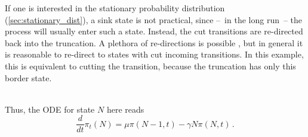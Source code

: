 \begin{example}
If one is interested in the stationary probability distribution (\autoref{sec:stationary_dist}), a sink state is not practical, since --~in the long run~-- the process will usually enter such a state.
Instead, the cut transitions are re-directed back into the truncation.
A plethora of re-directions is possible \parencite{gupta2017finite,kuntz2021stationary,spieler2014numerical}, but in general it is reasonable to re-direct to states with cut incoming transitions.
In this example, this is equivalent to cutting the transition, because the truncation has only this border state.
\vspace{2em}\\
\vspace{2em}\\
Thus, the \ac{ODE} for state $N$ here reads
\[
    \frac{d}{dt}\pi_t(N)=\mu \pi(N-1, t) - \gamma N\pi(N, t)\,.
\]
\end{example}

